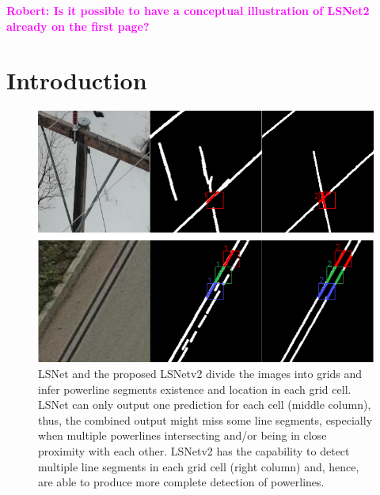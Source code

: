 \documentclass[journal]{IEEEtran}
\newcommand{\commentR}[1]{\textbf{\textcolor{magenta}{Robert: #1}}}
\begin{document}
%
\IEEEpeerreviewmaketitle

\commentR{Is it possible to have a conceptual illustration of LSNet2 already on the first page?}

\section{Introduction}

\begin{figure}[hbt!]
  \includegraphics[width=\linewidth]{imgs/others/first.png}
  \caption{LSNet and the proposed LSNetv2 divide the images into grids and infer powerline segments existence and location in each grid cell. LSNet can only output one prediction for each cell (middle column), thus, the combined output might miss some line segments, especially when multiple powerlines intersecting and/or being in close proximity with each other. LSNetv2 has the capability to detect multiple line segments in each grid cell (right column) and, hence, are able to produce more complete detection of powerlines.}
  \label{first_examples}
\end{figure}

% 
% 
% 
% 
\end{document}

